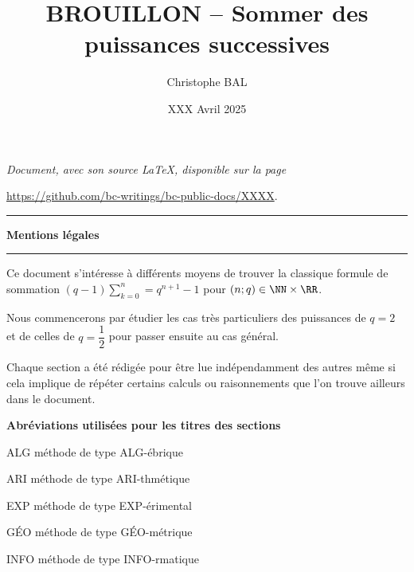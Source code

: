 \documentclass[12pt]{amsart}
\newcommand\methodo[2]{méthode de type \uppercase{#1}-#2}
\begin{document}
\title{BROUILLON -- Sommer des puissances successives}
\author{Christophe BAL}
\date{XXX Avril 2025}

\maketitle

\begin{center}
	\itshape
	Document, avec son source \LaTeX, disponible sur la page

	\url{https://github.com/bc-writings/bc-public-docs/XXXX}.
\end{center}


\bigskip


\begin{center}
	\hrule\vspace{.3em}
	{
		\fontsize{1.35em}{1em}\selectfont
		\textbf{Mentions \og légales \fg}
	}

	\vspace{0.45em}
	\doclicenseThis
	\hrule
\end{center}


\bigskip


\setcounter{tocdepth}{2}
\tableofcontents




\newpage

\begin{meta-abstract*}
	Ce document s'intéresse à différents moyens de trouver la classique formule de sommation $(q - 1) \sum_{k=0}^{n} = q^{n+1} - 1$ pour $(n ; q) \in \NN \times \RR$.
\end{meta-abstract*}




\begin{tcolorbox}
		Nous commencerons par étudier les cas très particuliers des puis\-sances de $q = 2$ et de celles de $q = \dfrac12$ pour passer ensuite au cas général.

Chaque section a été rédigée pour être lue indépendamment des autres même si cela implique de répéter certains calculs ou raisonnements que l'on trouve ailleurs dans le document.

	\bigskip
	
	\begin{center}
		\textbf{Abréviations utilisées pour les titres des sections} 
	\end{center}
	
	\smallskip
	
	\begin{methods}
		\item[ALG]
		      \methodo{alg}{ébrique}

		\item[ARI]
		      \methodo{ari}{thmétique}

		\item[EXP]
		      \methodo{exp}{érimental}

		\item[GÉO]
		      \methodo{géo}{métrique}

		\item[INFO]
		      \methodo{info}{rmatique}
	\end{methods}
\end{tcolorbox}
\end{document}
